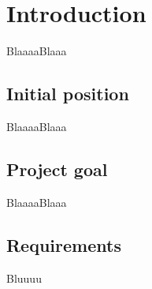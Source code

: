 \chapter{Introduction}

BlaaaaBlaaa

\section{Initial position}

BlaaaaBlaaa


\section{Project goal}

BlaaaaBlaaa

\section{Requirements}

Bluuuu
